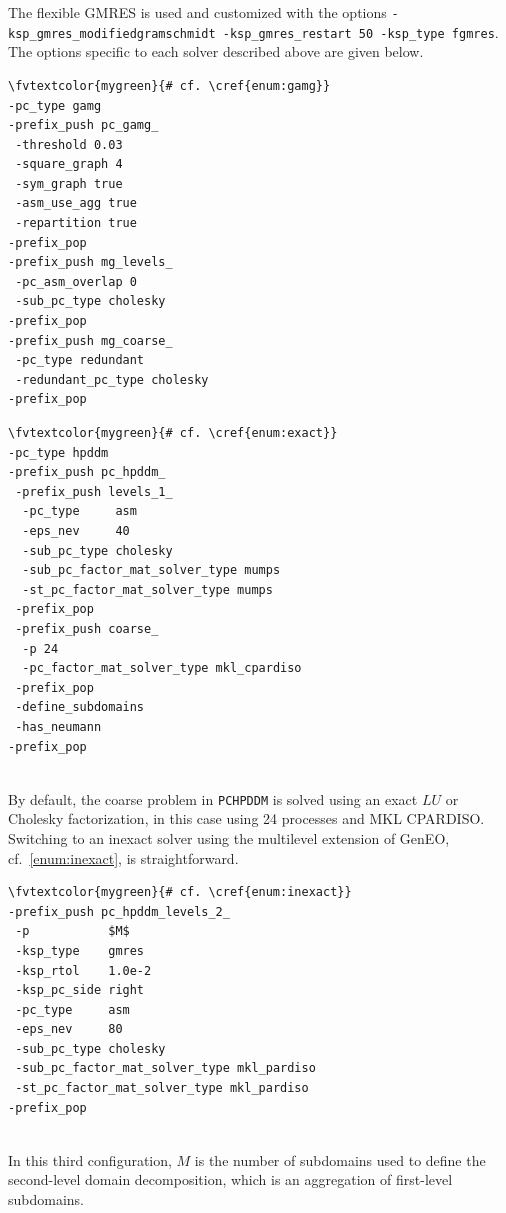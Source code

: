 \documentclass[3p,11pt]{elsarticle}
\newcommand{\pk}[1]{\texttt{#1}}
\newcommand*{\fvtextcolor}[2]{\textcolor{#1}{#2}}
\begin{document}
The flexible GMRES is used and customized with the options \pk{-ksp\_gmres\_modifiedgramschmidt
-ksp\_gmres\_restart 50
-ksp\_type fgmres}. The options specific to each solver described above are given below. \\[-4pt]
\begin{minipage}[t]{0.34\textwidth}
\begin{Verbatim}[fontsize=\footnotesize,frame=single,framerule=0.1mm,commandchars=\\\{\}]
\fvtextcolor{mygreen}{# cf. \cref{enum:gamg}}
-pc_type gamg
-prefix_push pc_gamg_
 -threshold 0.03
 -square_graph 4
 -sym_graph true
 -asm_use_agg true
 -repartition true
-prefix_pop
-prefix_push mg_levels_
 -pc_asm_overlap 0
 -sub_pc_type cholesky
-prefix_pop
-prefix_push mg_coarse_
 -pc_type redundant
 -redundant_pc_type cholesky
-prefix_pop
\end{Verbatim}
\end{minipage}
\hfill
\begin{minipage}[t]{0.49\textwidth}
\begin{Verbatim}[fontsize=\footnotesize,frame=single,framerule=0.1mm,commandchars=\\\{\}]
\fvtextcolor{mygreen}{# cf. \cref{enum:exact}}
-pc_type hpddm
-prefix_push pc_hpddm_
 -prefix_push levels_1_
  -pc_type     asm
  -eps_nev     40
  -sub_pc_type cholesky
  -sub_pc_factor_mat_solver_type mumps
  -st_pc_factor_mat_solver_type mumps
 -prefix_pop
 -prefix_push coarse_
  -p 24
  -pc_factor_mat_solver_type mkl_cpardiso
 -prefix_pop
 -define_subdomains
 -has_neumann
-prefix_pop
\end{Verbatim}
\end{minipage} \\
By default, the coarse problem in \pk{PCHPDDM} is solved using an exact $LU$ or Cholesky factorization, in this case using 24 processes and MKL CPARDISO. Switching to an inexact solver using the multilevel extension of GenEO, cf.~\cref{enum:inexact}, is straightforward. \\[-4pt]
\begin{minipage}[t]{0.525\textwidth}
\begin{Verbatim}[fontsize=\footnotesize,frame=single,framerule=0.1mm,commandchars=\\\{\}, codes={\catcode`$=3\catcode`^=7}]
\fvtextcolor{mygreen}{# cf. \cref{enum:inexact}}
-prefix_push pc_hpddm_levels_2_
 -p           $M$
 -ksp_type    gmres
 -ksp_rtol    1.0e-2
 -ksp_pc_side right
 -pc_type     asm
 -eps_nev     80
 -sub_pc_type cholesky
 -sub_pc_factor_mat_solver_type mkl_pardiso
 -st_pc_factor_mat_solver_type mkl_pardiso
-prefix_pop
\end{Verbatim}
\end{minipage} \\
In this third configuration, $M$ is the number of subdomains used to define the second-level domain decomposition, which is an aggregation of first-level subdomains.
\end{document}
